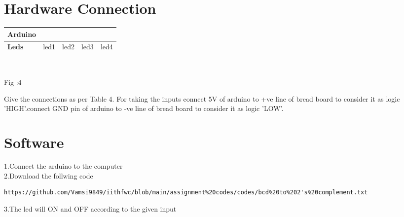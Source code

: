 \documentclass[10pt, a4paper]{article}
\begin{document}
     
    \section{Hardware Connection}


    
     \begin{tabularx}{0.4\textwidth} {  
  | >{\centering\arraybackslash}X
  | >{\centering\arraybackslash}X 
  | >{\centering\arraybackslash}X 
  | >{\centering\arraybackslash}X  
  | >{\centering\arraybackslash}X |}
  \hline
\textbf{Arduino} &  2  &  3  &  4  &  5\\
\hline
\textbf{Leds}    & led1 & led2 & led3 & led4\\
\hline
 \end{tabularx}\\

 \begin{center}
 Fig :4
   \end{center}




   Give the connections as per Table 4. For taking the inputs connect 5V of arduino to +ve line of bread board to consider it as logic 'HIGH'.connect GND pin of arduino to -ve line of bread board to consider it as logic 'LOW'.


    
    
 
 


  
  \section{Software}
  1.Connect the arduino to the computer
  \\2.Download the follwing code
  
  \begin{lstlisting}
https://github.com/Vamsi9849/iithfwc/blob/main/assignment%20codes/codes/bcd%20to%202's%20complement.txt
  \end{lstlisting}
  3.The led will ON and OFF according to the given input 




    

    
 
\end{document}
